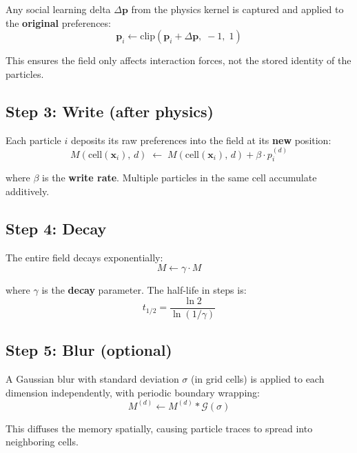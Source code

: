 \documentclass[11pt,a4paper]{article}
\begin{document}
Any social learning delta $\Delta \mathbf{p}$ from the physics kernel is captured and applied to the \textbf{original} preferences:
\begin{equation}
\mathbf{p}_i \leftarrow \mathrm{clip}\!\left(\mathbf{p}_i + \Delta \mathbf{p},\; -1,\; 1\right)
\end{equation}

This ensures the field only affects interaction forces, not the stored identity of the particles.

\subsection{Step 3: Write (after physics)}

Each particle $i$ deposits its raw preferences into the field at its \textbf{new} position:
\begin{equation}
M\!\left(\mathrm{cell}(\mathbf{x}_i),\, d\right) \;\leftarrow\; M\!\left(\mathrm{cell}(\mathbf{x}_i),\, d\right) + \beta \cdot p_i^{(d)}
\end{equation}

where $\beta$ is the \textbf{write rate}. Multiple particles in the same cell accumulate additively.

\subsection{Step 4: Decay}

The entire field decays exponentially:
\begin{equation}
M \leftarrow \gamma \cdot M
\end{equation}

where $\gamma$ is the \textbf{decay} parameter. The half-life in steps is:
\begin{equation}
t_{1/2} = \frac{\ln 2}{\ln(1/\gamma)}
\end{equation}

\subsection{Step 5: Blur (optional)}

A Gaussian blur with standard deviation $\sigma$ (in grid cells) is applied to each dimension independently, with periodic boundary wrapping:
\begin{equation}
M^{(d)} \leftarrow M^{(d)} * \mathcal{G}(\sigma)
\end{equation}

This diffuses the memory spatially, causing particle traces to spread into neighboring cells.
\end{document}
